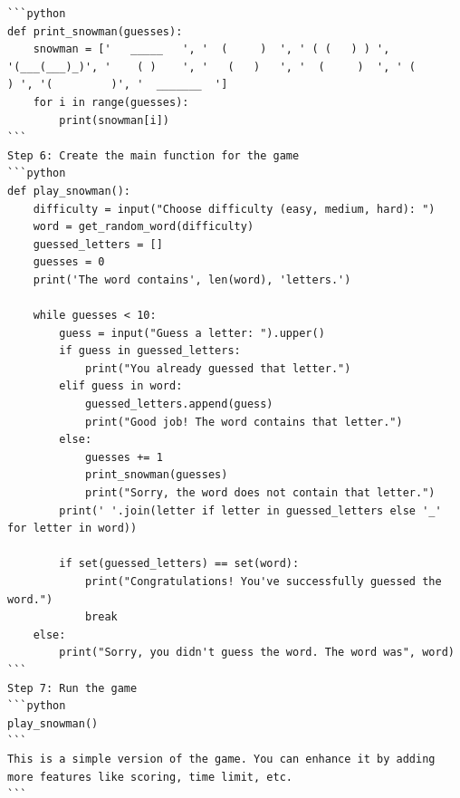 \documentclass{article}
\begin{document}
\begin{tcolorbox}
\begin{lstlisting}
```python
def print_snowman(guesses):
    snowman = ['   _____   ', '  (     )  ', ' ( (   ) ) ', '(___(___)_)', '    ( )    ', '   (   )   ', '  (     )  ', ' (       ) ', '(         )', '  _______  ']
    for i in range(guesses):
        print(snowman[i])
```
Step 6: Create the main function for the game
```python
def play_snowman():
    difficulty = input("Choose difficulty (easy, medium, hard): ")
    word = get_random_word(difficulty)
    guessed_letters = []
    guesses = 0
    print('The word contains', len(word), 'letters.')

    while guesses < 10:
        guess = input("Guess a letter: ").upper()
        if guess in guessed_letters:
            print("You already guessed that letter.")
        elif guess in word:
            guessed_letters.append(guess)
            print("Good job! The word contains that letter.")
        else:
            guesses += 1
            print_snowman(guesses)
            print("Sorry, the word does not contain that letter.")
        print(' '.join(letter if letter in guessed_letters else '_' for letter in word))

        if set(guessed_letters) == set(word):
            print("Congratulations! You've successfully guessed the word.")
            break
    else:
        print("Sorry, you didn't guess the word. The word was", word)
```
Step 7: Run the game
```python
play_snowman()
```
This is a simple version of the game. You can enhance it by adding more features like scoring, time limit, etc.
```
\end{lstlisting}
\end{tcolorbox}
\end{document}
